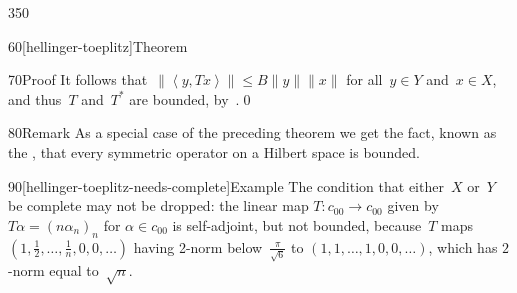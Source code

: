 \begin{parsec}{350}
\begin{point}{60}[hellinger-toeplitz]{Theorem}
\begin{point}{70}{Proof}
It follows that~$\|\left<y,Tx\right>\|\leq B\|y\|\|x\|$
for all~$y\in Y$ and~$x\in X$,
and thus~$T$ and~$T^*$ are bounded, by~.\qed
\end{point}
\begin{point}{80}{Remark}%
As a special case of the preceding theorem
we get the fact,
known as the ,%
that every symmetric
operator on a Hilbert space is bounded.
\end{point}
\begin{point}{90}[hellinger-toeplitz-needs-complete]{Example}%
The condition that either~$X$ or~$Y$ be complete may not be dropped:
the linear map $T\colon c_{00}\to c_{00}$
given by $T\alpha = (n\alpha_n)_n$ for $\alpha\in c_{00}$
is self-adjoint,
but not bounded,
because~$T$ maps $(1,\frac{1}{2},\dotsc,\frac{1}{n},0,0,\dotsc)$
having 2-norm below~$\frac{\pi}{\sqrt{6}}$
to $(1,1,\dotsc,1,0,0,\dotsc)$,
which has $2$-norm equal to~$\sqrt{n}$.
\end{point}
\end{point}
\end{parsec}

